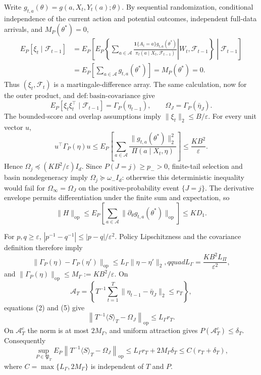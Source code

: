 Write \(g_{t,a}(\theta)=g(a,X_t,Y_t(a);\theta)\).  By sequential randomization, conditional independence of the current action and potential outcomes, independent full-data arrivals, and \(M_P(\theta^*)=0\),
\[
\begin{aligned}
E_P[\xi_t\mid\mathcal F_{t-1}]
&=E_P\!\left[E_P\!\left\{\left.\sum_{a\in\mathcal A}
 \frac{\mathbf 1\{A_t=a\}g_{t,a}(\theta^*)}
 {\pi_t(a\mid X_t,\mathcal F_{t-1})}
 \right|W_t,\mathcal F_{t-1}\right\}\middle|\mathcal F_{t-1}\right]\\
&=E_P\!\left[\sum_{a\in\mathcal A}g_{t,a}(\theta^*)\right]
=M_P(\theta^*)=0.
\end{aligned}
\tag{1}
\]
Thus \((\xi_t,\mathcal F_t)\) is a martingale-difference array.  The same calculation, now for the outer product, and \(\mathrm{def:basin\text{-}covariance}\) give
\[
 E_P[\xi_t\xi_t^\top\mid\mathcal F_{t-1}]
 =\Gamma_P(\eta_{t-1}),\qquad \Omega_J=\Gamma_P(\bar\eta_J).
\tag{2}
\]
The bounded-score and overlap assumptions imply \(\|\xi_t\|_2\le B/\varepsilon\).  For every unit vector \(u\),
\[
 u^\top\Gamma_P(\eta)u
 \le E_P\!\left[\sum_{a\in\mathcal A}
 \frac{\|g_{t,a}(\theta^*)\|_2^2}{\Pi(a\mid X_t,\eta)}\right]
 \le \frac{KB^2}{\varepsilon}.
\tag{3}
\]
Hence \(\Omega_j\preceq(KB^2/\varepsilon)I_d\).  Since \(P(J=j)\ge p_->0\), finite-tail selection and basin nondegeneracy imply \(\Omega_j\succeq\omega_-I_d\): otherwise this deterministic inequality would fail for \(\Omega_\infty=\Omega_J\) on the positive-probability event \(\{J=j\}\).  The derivative envelope permits differentiation under the finite sum and expectation, so
\[
 \|H\|_{\mathrm{op}}
 \le E_P\!\left[\sum_{a\in\mathcal A}
 \|\partial_\theta g_{t,a}(\theta^*)\|_{\mathrm{op}}\right]
 \le KD_1.
\tag{4}
\]

For \(p,q\ge\varepsilon\), \(|p^{-1}-q^{-1}|\le |p-q|/\varepsilon^2\).  Policy Lipschitzness and the covariance definition therefore imply
\[
 \|\Gamma_P(\eta)-\Gamma_P(\eta')\|_{\mathrm{op}}
 \le L_\Gamma\|\eta-\eta'\|_2,qquad
 L_\Gamma=\frac{KB^2L_\Pi}{\varepsilon^2},
\tag{5}
\]
and \(\|\Gamma_P(\eta)\|_{\mathrm{op}}\le M_\Gamma:=KB^2/\varepsilon\).  On
\[
 \mathcal A_T=\left\{T^{-1}\sum_{t=1}^T
 \|\eta_{t-1}-\bar\eta_J\|_2\le r_T\right\},
\]
equations (2) and (5) give
\[
 \left\|T^{-1}\langle S\rangle_T-\Omega_J\right\|_{\mathrm{op}}
 \le L_\Gamma r_T.
\tag{6}
\]
On \(\mathcal A_T^c\) the norm is at most \(2M_\Gamma\), and uniform attraction gives \(P(\mathcal A_T^c)\le\delta_T\).  Consequently
\[
 \sup_{P\in\mathfrak P_T}E_P\!\left\|T^{-1}\langle S\rangle_T-
 \Omega_J\right\|_{\mathrm{op}}
 \le L_\Gamma r_T+2M_\Gamma\delta_T
 \le C(r_T+\delta_T),
\tag{7}
\]
where \(C=\max\{L_\Gamma,2M_\Gamma\}\) is independent of \(T\) and \(P\).

